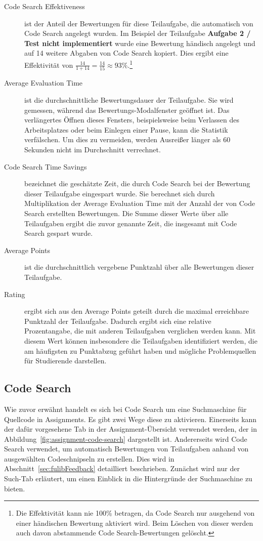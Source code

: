 \begin{description}
    \item[Code Search Effektiveness] ist der Anteil der Bewertungen für diese Teilaufgabe, die automatisch von Code Search angelegt wurden.
    Im Beispiel der Teilaufgabe \textbf{Aufgabe 2 / Test nicht implementiert} wurde eine Bewertung händisch angelegt und auf 14 weitere Abgaben von Code Search kopiert.
    Dies ergibt eine Effektivität von $\frac{14}{1 + 14} = \frac{14}{15} \approx 93\%$.\footnote{
        Die Effektivität kann nie 100\% betragen, da Code Search nur ausgehend von einer händischen Bewertung aktiviert wird.
        Beim Löschen von dieser werden auch davon abstammende Code Search-Bewertungen gelöscht.
    }
    \item[Average Evaluation Time] ist die durchschnittliche Bewertungsdauer der Teilaufgabe.
    Sie wird gemessen, während das Bewertungs-Modalfenster geöffnet ist.
    Das verlängertes Öffnen dieses Fensters, beispielsweise beim Verlassen des Arbeitsplatzes oder beim Einlegen einer Pause, kann die Statistik verfälschen.
    Um dies zu vermeiden, werden Ausreißer länger als 60 Sekunden nicht im Durchschnitt verrechnet.
    \item[Code Search Time Savings] bezeichnet die geschätzte Zeit, die durch Code Search bei der Bewertung dieser Teilaufgabe eingespart wurde.
    Sie berechnet sich durch Multiplikation der Average Evaluation Time mit der Anzahl der von Code Search erstellten Bewertungen.
    Die Summe dieser Werte über alle Teilaufgaben ergibt die zuvor genannte Zeit, die insgesamt mit Code Search gespart wurde.
    \item[Average Points] ist die durchschnittlich vergebene Punktzahl über alle Bewertungen dieser Teilaufgabe.
    \item[Rating] ergibt sich aus den Average Points geteilt durch die maximal erreichbare Punktzahl der Teilaufgabe.
    Dadurch ergibt sich eine relative Prozentangabe, die mit anderen Teilaufgaben verglichen werden kann.
    Mit diesem Wert können insbesondere die Teilaufgaben identifiziert werden, die am häufigsten zu Punktabzug geführt haben und mögliche Problemquellen für Studierende darstellen.
\end{description}

\subsection{Code Search}\label{subsec:code-search}

Wie zuvor erwähnt handelt es sich bei Code Search um eine Suchmaschine für Quellcode in Assignments.
Es gibt zwei Wege diese zu aktivieren.
Einerseits kann der dafür vorgesehene Tab in der Assignment-Übersicht verwendet werden, der in Abbildung~\ref{fig:assignment-code-search} dargestellt ist.
Andererseits wird Code Search verwendet, um automatisch Bewertungen von Teilaufgaben anhand von ausgewählten Codeschnipseln zu erstellen.
Dies wird in Abschnitt~\ref{sec:fulibFeedback} detailliert beschrieben.
Zunächst wird nur der Such-Tab erläutert, um einen Einblick in die Hintergründe der Suchmaschine zu bieten.

